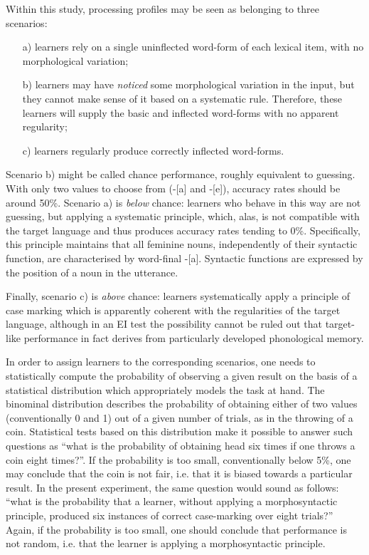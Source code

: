 Within this study, processing profiles may be seen as belonging to three scenarios: 

\begin{itemize}
    \item[a)] learners rely on a single uninflected word-form of each lexical item, with no morphological variation;
    \item[b)] learners may have \textit{noticed} some morphological variation in the input, but they cannot make sense of it based on a systematic rule. Therefore, these learners will supply the basic and inflected word-forms with no apparent regularity;
    \item[c)] learners regularly produce correctly inflected word-forms.
\end{itemize}

Scenario b) might be called chance performance, roughly equivalent to guessing. With only two values to choose from (-[a] and -[e]), accuracy rates should be around 50\%. Scenario a) is \textit{below} chance: learners who behave in this way are not guessing, but applying a systematic principle, which, alas, is not compatible with the target language and thus produces accuracy rates tending to 0\%. Specifically, this principle maintains that all feminine nouns, independently of their syntactic function, are characterised by word-final -[a]. Syntactic functions are expressed by the position of a noun in the utterance.

Finally, scenario c) is \textit{above} chance: learners systematically apply a principle of case marking which is apparently coherent with the regularities of the target language, although in an EI test the possibility cannot be ruled out that target-like performance in fact derives from particularly developed phonological memory.

In order to assign learners to the corresponding scenarios, one needs to statistically compute the probability of observing a given result on the basis of a statistical distribution which appropriately models the task at hand. The binominal distribution describes the probability of obtaining either of two values (conventionally 0 and 1) out of a given number of trials, as in the throwing of a coin. Statistical tests based on this distribution make it possible to answer such questions as ``what is the probability of obtaining head six times if one throws a coin eight times?''. If the probability is too small, conventionally below 5\%, one may conclude that the coin is not fair, i.e. that it is biased towards a particular result. In the present experiment, the same question would sound as follows: ``what is the probability that a learner, without applying a morphosyntactic principle, produced six instances of correct case-marking over eight trials?'' Again, if the probability is too small, one should conclude that performance is not random, i.e. that the learner is applying a morphosyntactic principle.

